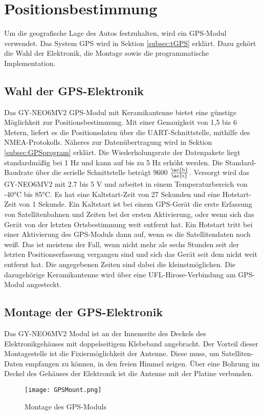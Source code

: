\section{Positionsbestimmung}
\label{sec:GPS}
Um die geografische Lage des Autos festzuhalten, wird ein \ac{GPS}-Modul verwendet. Das System \ac{GPS} wird in Sektion \ref{subsec:tGPS} erklärt. Dazu gehört die Wahl der Elektronik, die Montage sowie die programmatische Implementation.

\subsection{Wahl der GPS-Elektronik}
\label{subsec:GPSchoice}
Das GY-NEO6MV2 \ac{GPS}-Modul mit Keramikantenne bietet eine günstige Möglichkeit zur Positionsbestimmung. Mit einer Genauigkeit von 1,5 bis 6 Metern, liefert es die Positionsdaten über die \ac{UART}-Schnittstelle, mithilfe des \ac{NMEA}-Protokolls. Näheres zur Datenübertragung wird in Sektion \ref{subsec:GPSprogram} erklärt. Die Wiederholungsrate der Datenpakete liegt standardmäßig bei 1 \ac{Hz} und kann auf bis zu 5 \ac{Hz} erhöht werden. Die Standard-Baudrate über die serielle Schnittstelle beträgt 9600 $\frac{\mathrm{\ac{b}}}{\mathrm{\ac{s}}}$. Versorgt wird das GY-NEO6MV2 mit 2.7 bis 5 V und arbeitet in einem Temperaturbereich von -40°C bis 85°C. Es hat eine Kaltstart-Zeit von 27 Sekunden und eine Hotstart-Zeit von 1 Sekunde. Ein Kaltstart ist bei einem GPS-Gerät die erste Erfassung von Satellitenbahnen und Zeiten bei der ersten Aktivierung, oder wenn sich das Gerät von der letzten Ortsbestimmung weit entfernt hat. Ein Hotstart tritt bei einer Aktivierung des GPS-Moduls dann auf, wenn es die Satellitendaten noch weiß. Das ist meistens der Fall, wenn nicht mehr als sechs Stunden seit der letzten Positionserfassung vergangen sind und sich das Gerät seit dem nicht weit entfernt hat. Die angegebenen Zeiten sind dabei die kleinstmöglichen. Die dazugehörige Keramikantenne wird über eine UFL-Hirose-Verbindung am GPS-Modul angesteckt. 

\subsection{Montage der GPS-Elektronik}
\label{subsec:GPSmount}
Das GY-NEO6MV2 Modul ist an der Innenseite des Deckels des Elektronikgehäuses mit doppelseitigem Klebeband angebracht. Der Vorteil dieser Montagestelle ist die Fixiermöglichkeit der Antenne. Diese muss, um Satelliten-Daten empfangen zu können, in den freien Himmel zeigen. Über eine Bohrung im Deckel des Gehäuses der Elektronik ist die Antenne mit der Platine verbunden.
\begin{figure}[h]
\centering
\texttt{[image: GPSMount.png]}
\caption{Montage des \ac{GPS}-Moduls}
\label{fig:GPSMount}
\end{figure}

